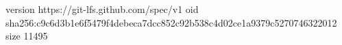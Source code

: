 version https://git-lfs.github.com/spec/v1
oid sha256:c9c6d3b1e6f5479f4debeca7dcc852c92b538c4d02ce1a9379c5270746322012
size 11495
